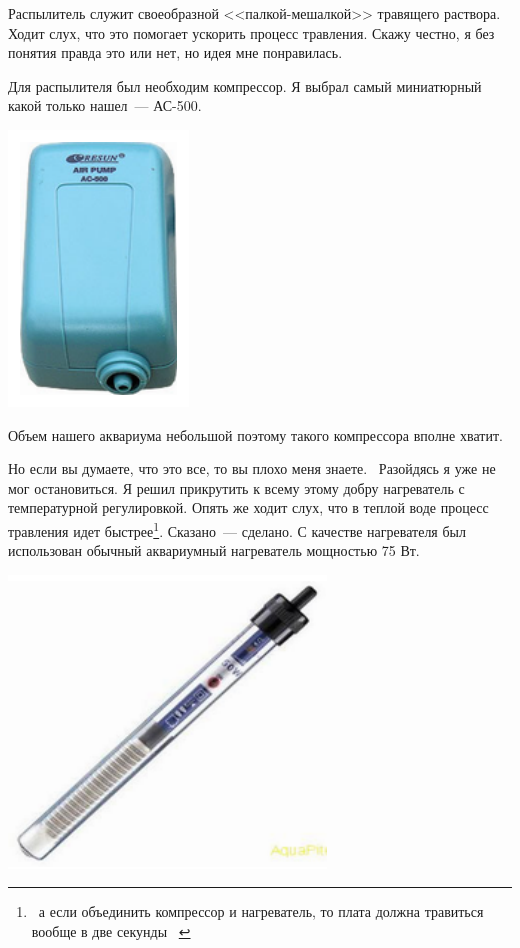 \documentclass{magazine}
\begin{document}
{Распылитель служит своеобразной <<палкой-мешалкой>> травящего 
раствора. Ходит слух, что это помогает ускорить процесс травления. Скажу 
честно, я без понятия правда это или нет, но идея мне понравилась. 

Для распылителя был необходим компрессор. Я выбрал самый 
миниатюрный какой только нашел\ --- АС-500.

\noindent\includegraphics[width=0.5\columnwidth]{fig/00/smit/ee000022.png}

Объем нашего аквариума небольшой поэтому такого компрессора вполне хватит.

Но если вы думаете, что это все, то вы плохо меня знаете. \smiley\ Разойдясь я
уже не мог остановиться. Я решил прикрутить к всему этому добру нагреватель с
температурной регулировкой. Опять же ходит слух, что в теплой воде процесс
травления идет быстрее\footnote{\ а если объединить компрессор и нагреватель, то
плата должна травиться вообще в две секунды \smiley\ }. Сказано\ --- сделано. С
качестве нагревателя был использован обычный аквариумный нагреватель мощностью
75 Вт.

\noindent\includegraphics[width=\columnwidth]{fig/00/smit/ee000023.png}

}
\end{document}
